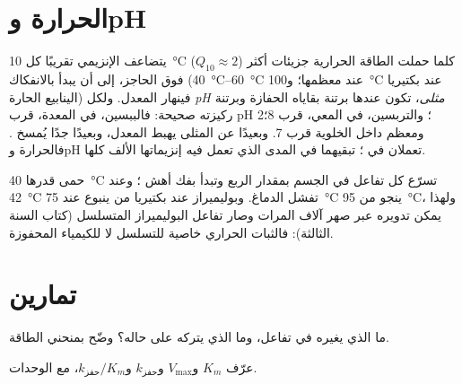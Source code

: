 \section{الحرارة وpH}

\begin{proposition}\label{prop:b1:enzymes:environment}
يتضاعف  الإنزيمي تقريبًا كل \qty{10}{\celsius}
($Q_{10} \approx 2$) كلما حملت الطاقة الحرارية جزيئات أكثر فوق
الحاجز، إلى أن يبدأ  بالانفكاك
(\qtyrange{40}{60}{\celsius} عند معظمها؛ و\qty{100}{\celsius} عند
 بكتيريا الينابيع الحارة) فينهار المعدل. ولكل 
\emph{pH مثلى}، تكون عندها برتنة بقاياه الحفازة وبرتنة ركيزته
صحيحة: فالببسين، في المعدة، قرب pH 2؛ والتربسين، في المعي، قرب 8؛
ومعظم  داخل الخلوية قرب 7. وبعيدًا عن المثلى يهبط المعدل،
وبعيدًا جدًا يُمسخ . فالحرارة وpH تعملان في ؛ 
تبقيهما في المدى الذي تعمل فيه إنزيماتها الألف كلها.
\end{proposition}

\begin{example}\label{ex:b1:enzymes:fever}
حمى قدرها \qty{40}{\celsius} تسرّع كل تفاعل في الجسم بمقدار الربع
وتبدأ بفك أهش ؛ وعند \qty{42}{\celsius} تفشل 
الدماغ. وبوليميراز  عند بكتيريا من ينبوع عند \qty{75}{\celsius}
ينجو من \qty{95}{\celsius}، ولهذا يمكن تدويره عبر صهر  آلاف
المرات وصار  تفاعل البوليميراز المتسلسل (كتاب السنة الثالثة):
فالثبات الحراري خاصية للتسلسل لا للكيمياء المحفوزة.
\end{example}

\section{تمارين}

\begin{exercise}[$\star$]\label{exo:b1:enzymes:1}
ما الذي يغيره  في تفاعل، وما الذي يتركه على حاله؟ وضّح
بمنحني الطاقة.
\end{exercise}

\begin{exercise}[$\star$]\label{exo:b1:enzymes:2}
عرّف $K_m$ و$V_{\max}$ و$k_{\text{حفز}}$ و$k_{\text{حفز}}/K_m$، مع
الوحدات.
\end{exercise}

